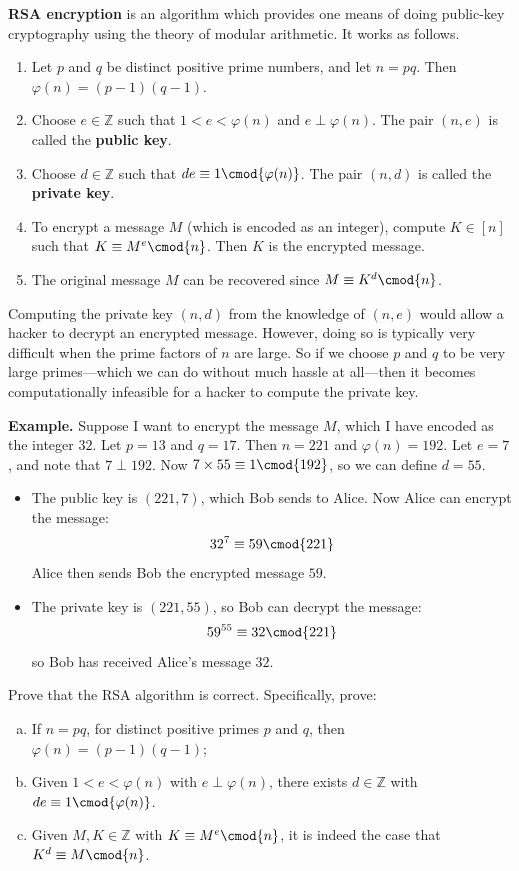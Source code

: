 \textbf{RSA encryption} is an algorithm which provides one means of doing public-key cryptography using the theory of modular arithmetic. It works as follows.
\begin{enumerate}[leftmargin={37.5pt}, label={\textbf{Step \arabic*.}}]
\item Let $p$ and $q$ be distinct positive prime numbers, and let $n = pq$. Then $\varphi(n) = (p-1)(q-1)$.
\item Choose $e \in \mathbb{Z}$ such that $1 < e < \varphi(n)$ and $e \perp \varphi(n)$. The pair $(n,e)$ is called the \textbf{public key}.
\item Choose $d \in \mathbb{Z}$ such that $de \equiv 1 \cmod{\varphi(n)}$. The pair $(n,d)$ is called the \textbf{private key}.
\item To encrypt a message $M$ (which is encoded as an integer), compute $K \in [n]$ such that $K \equiv M^e \cmod{n}$. Then $K$ is the encrypted message.
\item The original message $M$ can be recovered since $M \equiv K^d \cmod{n}$.
\end{enumerate}
Computing the private key $(n,d)$ from the knowledge of $(n,e)$ would allow a hacker to decrypt an encrypted message. However, doing so is typically very difficult when the prime factors of $n$ are large. So if we choose $p$ and $q$ to be very large primes---which we can do without much hassle at all---then it becomes computationally infeasible for a hacker to compute the private key.

\textbf{Example.} Suppose I want to encrypt the message $M$, which I have encoded as the integer $32$. Let $p=13$ and $q=17$. Then $n=221$ and $\varphi(n)=192$. Let $e = 7$, and note that $7 \perp 192$. Now $7 \times 55 \equiv 1 \cmod{192}$, so we can define $d=55$.
\begin{itemize}
\item The public key is $(221,7)$, which Bob sends to Alice. Now Alice can encrypt the message:
\[ 32^7 \equiv 59 \cmod{221} \]
Alice then sends Bob the encrypted message $59$.
\item The private key is $(221, 55)$, so Bob can decrypt the message:
\[ 59^{55} \equiv 32 \cmod{221} \]
so Bob has received Alice's message $32$.
\end{itemize}

\begin{exercise}
Prove that the RSA algorithm is correct. Specifically, prove:
\begin{enumerate}[(a)]
\item If $n=pq$, for distinct positive primes $p$ and $q$, then $\varphi(n) = (p-1)(q-1)$;
\item Given $1<e<\varphi(n)$ with $e \perp \varphi(n)$, there exists $d \in \mathbb{Z}$ with $de \equiv 1 \cmod{\varphi(n)}$.
\item Given $M,K \in \mathbb{Z}$ with $K \equiv M^e \cmod{n}$, it is indeed the case that $K^d \equiv M \cmod{n}$.
\end{enumerate}
\end{exercise}

